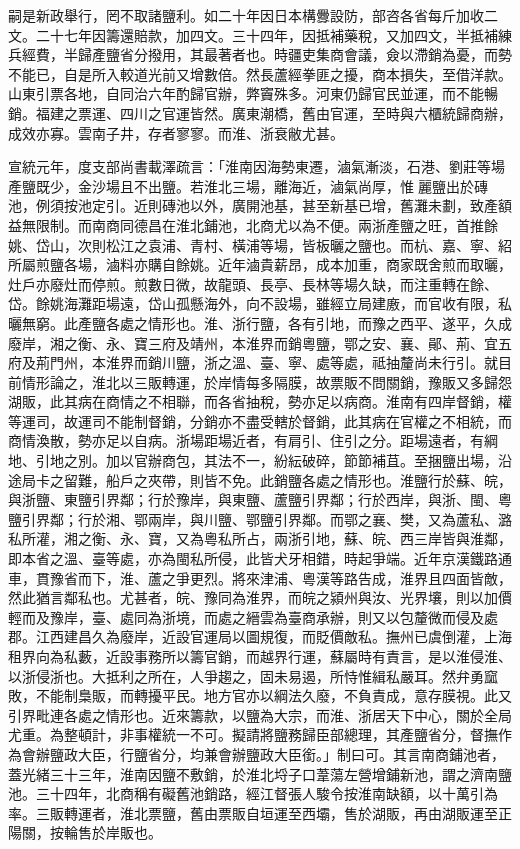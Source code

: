 \begin{pinyinscope}
嗣是新政舉行，罔不取諸鹽利。如二十年因日本構釁設防，部咨各省每斤加收二文。二十七年因籌還賠款，加四文。三十四年，因抵補藥稅，又加四文，半抵補練兵經費，半歸產鹽省分撥用，其最著者也。時疆吏集商會議，僉以滯銷為憂，而勢不能已，自是所入較道光前又增數倍。然長蘆經拳匪之擾，商本損失，至借洋款。山東引票各地，自同治六年酌歸官辦，弊竇殊多。河東仍歸官民並運，而不能暢銷。福建之票運、四川之官運皆然。廣東潮橋，舊由官運，至時與六櫃統歸商辦，成效亦寡。雲南子井，存者寥寥。而淮、浙衰敝尤甚。

宣統元年，度支部尚書載澤疏言：「淮南因海勢東遷，滷氣漸淡，石港、劉莊等場產鹽既少，金沙場且不出鹽。若淮北三場，離海近，滷氣尚厚，惟麗鹽出於磚池，例須按池定引。近則磚池以外，廣開池基，甚至新基已增，舊灘未劃，致產額益無限制。而南商同德昌在淮北鋪池，北商尤以為不便。兩浙產鹽之旺，首推餘姚、岱山，次則松江之袁浦、青村、橫浦等場，皆板曬之鹽也。而杭、嘉、寧、紹所屬煎鹽各場，滷料亦購自餘姚。近年滷貴薪昂，成本加重，商家既舍煎而取曬，灶戶亦廢灶而停煎。煎數日微，故龍頭、長亭、長林等場久缺，而注重轉在餘、岱。餘姚海灘距場遠，岱山孤懸海外，向不設場，雖經立局建廒，而官收有限，私曬無窮。此產鹽各處之情形也。淮、浙行鹽，各有引地，而豫之西平、遂平，久成廢岸，湘之衡、永、寶三府及靖州，本淮界而銷粵鹽，鄂之安、襄、鄖、荊、宜五府及荊門州，本淮界而銷川鹽，浙之溫、臺、寧、處等處，祗抽釐尚未行引。就目前情形論之，淮北以三販轉運，於岸情每多隔膜，故票販不問關銷，豫販又多歸怨湖販，此其病在商情之不相聯，而各省抽稅，勢亦足以病商。淮南有四岸督銷，權等運司，故運司不能制督銷，分銷亦不盡受轄於督銷，此其病在官權之不相統，而商情渙散，勢亦足以自病。浙場距場近者，有肩引、住引之分。距場遠者，有綱地、引地之別。加以官辦商包，其法不一，紛紜破碎，節節補苴。至捆鹽出場，沿途局卡之留難，船戶之夾帶，則皆不免。此銷鹽各處之情形也。淮鹽行於蘇、皖，與浙鹽、東鹽引界鄰；行於豫岸，與東鹽、蘆鹽引界鄰；行於西岸，與浙、閩、粵鹽引界鄰；行於湘、鄂兩岸，與川鹽、鄂鹽引界鄰。而鄂之襄、樊，又為蘆私、潞私所灌，湘之衡、永、寶，又為粵私所占，兩浙引地，蘇、皖、西三岸皆與淮鄰，即本省之溫、臺等處，亦為閩私所侵，此皆犬牙相錯，時起爭端。近年京漢鐵路通車，貫豫省而下，淮、蘆之爭更烈。將來津浦、粵漢等路告成，淮界且四面皆敵，然此猶言鄰私也。尤甚者，皖、豫同為淮界，而皖之潁州與汝、光界壤，則以加價輕而及豫岸，臺、處同為浙境，而處之縉雲為臺商承辦，則又以包釐微而侵及處郡。江西建昌久為廢岸，近設官運局以圖規復，而貶價敵私。撫州已虞倒灌，上海租界向為私藪，近設事務所以籌官銷，而越界行運，蘇屬時有責言，是以淮侵淮、以浙侵浙也。大抵利之所在，人爭趨之，固未易遏，所恃惟緝私嚴耳。然弁勇窳敗，不能制梟販，而轉擾平民。地方官亦以綱法久廢，不負責成，意存膜視。此又引界毗連各處之情形也。近來籌款，以鹽為大宗，而淮、浙居天下中心，關於全局尤重。為整頓計，非事權統一不可。擬請將鹽務歸臣部總理，其產鹽省分，督撫作為會辦鹽政大臣，行鹽省分，均兼會辦鹽政大臣銜。」制曰可。其言南商鋪池者，蓋光緒三十三年，淮南因鹽不敷銷，於淮北埒子口葦蕩左營增鋪新池，謂之濟南鹽池。三十四年，北商稱有礙舊池銷路，經江督張人駿令按淮南缺額，以十萬引為率。三販轉運者，淮北票鹽，舊由票販自垣運至西壩，售於湖販，再由湖販運至正陽關，按輪售於岸販也。


\end{pinyinscope}

